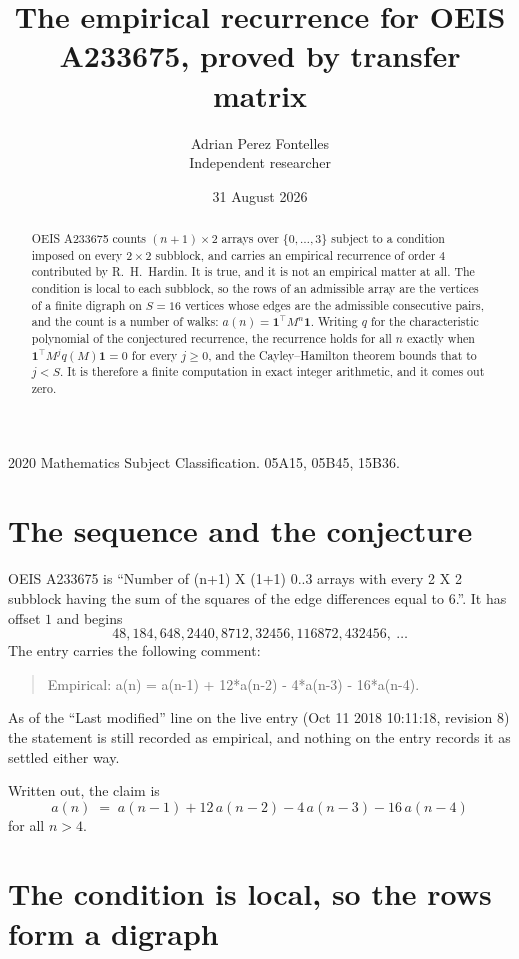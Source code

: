 \documentclass[11pt,a4paper]{article}
\title{The empirical recurrence for OEIS A233675, proved by transfer matrix}
\author{Adrian Perez Fontelles\\ \small Independent researcher}
\date{31 August 2026}
\theoremstyle{plain}
\theoremstyle{definition}
\begin{document}
\maketitle

\begin{abstract}
OEIS A233675 counts $(n+1)\times2$ arrays over $\{0,\dots,3\}$ subject to a condition imposed on
every $2\times2$ subblock, and carries an empirical recurrence of order $4$ contributed
by R.~H.~Hardin. It is true, and it is not an empirical matter at all. The condition is local
to each subblock, so the rows of an admissible array are the vertices of a finite digraph
on $S=16$ vertices whose edges are the admissible consecutive pairs, and the count is a
number of walks: $a(n)=\mathbf{1}^{\!\top}M^{n}\mathbf{1}$. Writing $q$
for the characteristic polynomial of the conjectured recurrence, the recurrence holds for all
$n$ exactly when $\mathbf{1}^{\!\top}M^{j}q(M)\mathbf{1}=0$ for every $j\ge0$, and the
Cayley--Hamilton theorem bounds that to $j<S$. It is therefore a finite computation in exact
integer arithmetic, and it comes out zero.
\end{abstract}

\noindent\small 2020 Mathematics Subject Classification. 05A15, 05B45, 15B36.\normalsize

\section{The sequence and the conjecture}

OEIS A233675 is ``Number of (n+1) X (1+1) 0..3 arrays with every 2 X 2 subblock having the sum of the squares of the edge differences equal to 6.''. It has offset $1$ and begins
\[
48, 184, 648, 2440, 8712, 32456, 116872, 432456,\ \dots
\]
The entry carries the following comment:
\begin{quote}\small
Empirical: a(n) = a(n-1) + 12*a(n-2) - 4*a(n-3) - 16*a(n-4).
\end{quote}
As of the ``Last modified'' line on the live entry (Oct 11 2018 10:11:18, revision 8) the statement is
still recorded as empirical, and nothing on the entry records it as settled either way.

Written out, the claim is
\begin{equation}\label{eq:conj}
a(n)\;=\;a(n-1) + 12\,a(n-2) - 4\,a(n-3) - 16\,a(n-4)
\end{equation}
for all $n>4$.

\section{The condition is local, so the rows form a digraph}
\end{document}
